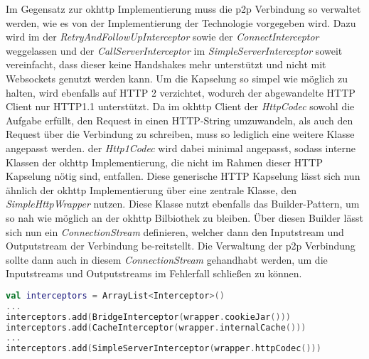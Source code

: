         Im Gegensatz zur okhttp Implementierung muss die p2p Verbindung so verwaltet werden, wie es von der Implementierung der Technologie vorgegeben wird. Dazu wird im  der {\it RetryAndFollowUpInterceptor} sowie der {\it ConnectInterceptor} weggelassen und der {\it CallServerInterceptor} im {\it SimpleServerInterceptor} soweit vereinfacht, dass dieser keine Handshakes mehr unterstützt und nicht mit Websockets genutzt werden kann. Um die Kapselung so simpel wie möglich zu halten, wird ebenfalls auf HTTP 2 verzichtet, wodurch der abgewandelte HTTP Client nur HTTP1.1 unterstützt. Da im okhttp Client der {\it HttpCodec} sowohl die Aufgabe erfüllt, den Request in einen HTTP-String umzuwandeln, als auch den Request über die Verbindung zu schreiben, muss so lediglich eine weitere Klasse angepasst werden. der {\it Http1Codec} wird dabei minimal angepasst, sodass interne Klassen der okhttp Implementierung, die nicht im Rahmen dieser HTTP Kapselung nötig sind, entfallen. Diese generische HTTP Kapselung lässt sich nun ähnlich der okhttp Implementierung über eine zentrale Klasse, den {\it SimpleHttpWrapper} nutzen. Diese Klasse nutzt ebenfalls das Builder-Pattern, um so nah wie möglich an der okhttp Bilbiothek zu bleiben. Über diesen Builder lässt sich nun ein {\it ConnectionStream} definieren, welcher dann den Inputstream und Outputstream der Verbindung be-reitstellt. Die Verwaltung der p2p Verbindung sollte dann auch in diesem {\it ConnectionStream} gehandhabt werden, um die Inputstreams und Outputstreams im Fehlerfall schließen zu können.

        \begin{lstlisting}[frame=bt, label={lst:android:okhttpchanges}, language=Kotlin, caption=Änderungen an okhttp (Clientcode in Kotlin)]
val interceptors = ArrayList<Interceptor>()
...
interceptors.add(BridgeInterceptor(wrapper.cookieJar()))
interceptors.add(CacheInterceptor(wrapper.internalCache()))
...
interceptors.add(SimpleServerInterceptor(wrapper.httpCodec()))
        \end{lstlisting}        
        
